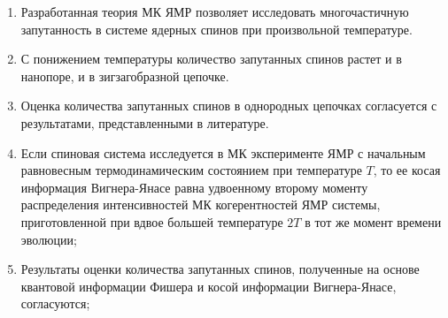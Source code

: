 \begin{enumerate}
  \item
  Разработанная теория МК ЯМР позволяет исследовать многочастичную запутанность в системе ядерных спинов при произвольной температуре.

  \item
  С понижением температуры количество запутанных спинов растет и в нанопоре, и в зигзагобразной цепочке. 

  \item
  Оценка количества запутанных спинов в однородных цепочках согласуется с результатами, представленными в литературе.

  \item
  Если спиновая система исследуется в МК эксперименте ЯМР с начальным равновесным термодинамическим состоянием при температуре $T$, 
  то ее косая информация Вигнера-Янасе равна удвоенному второму моменту распределения интенсивностей МК когерентностей ЯМР системы, приготовленной при вдвое большей температуре $2T$ в тот же момент времени эволюции;

  \item
  Результаты оценки количества запутанных спинов, полученные на основе квантовой информации Фишера и косой информации Вигнера-Янасе, согласуются;
\end{enumerate}
